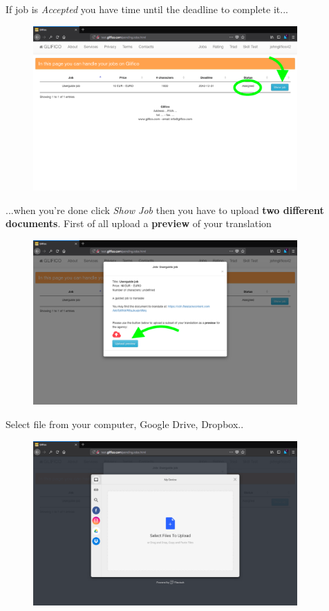 \documentclass[11 pt, a4paper]{article}
\begin{document}
\clearpage
If job is \textit{Accepted} you have time until the deadline to complete it...
\begin{figure}[H]
\centering
\includegraphics[width=0.9\textwidth]{translator_job4.png}
\end{figure}

...when you're done click \textit{Show Job} then you have to upload \textbf{two different documents}.
First of all upload a \textbf{preview} of your translation
\begin{figure}[H]
\centering
\includegraphics[width=0.9\textwidth]{translator_job5.png}
\end{figure}


\clearpage
Select file from your computer, Google Drive, Dropbox..
\begin{figure}[H]
\centering
\includegraphics[width=0.9\textwidth]{translator_job6.png}
\end{figure}
\end{document}
